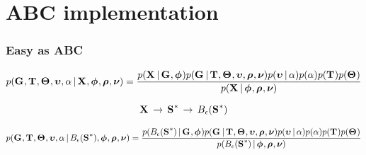 \section{ABC implementation}

\begin{frame}
    \frametitle{Easy as ABC}
    \begin{displaybox}
        \footnotesize
        \[
            p(\geneTreeVector, \divTimeMapVector, \demographicParamVector, 
            \locusMutationRateScalarVector, \locusRateHetShapeParameter \given
            \alignmentVector, \hkyModelVector, \ploidyScalarVector,
            \mutationRateScalarConstantVector) =
            \frac{p(\alignmentVector \given \geneTreeVector, \hkyModelVector)
                p(\geneTreeVector \given \divTimeMapVector, \demographicParamVector,
                \locusMutationRateScalarVector, \ploidyScalarVector,
                \mutationRateScalarConstantVector)
                p(\locusMutationRateScalarVector \given \locusRateHetShapeParameter)
                p(\locusRateHetShapeParameter)
                p(\divTimeMapVector)
                p(\demographicParamVector)}{
                p(\alignmentVector \given \hkyModelVector, \ploidyScalarVector,
                \mutationRateScalarConstantVector)}
        \]\vspace{0mm}
    \end{displaybox}

    \[ \alignmentVector \, \to \, \ssVectorObs \, \to \, \ssSpace\]

    \begin{displaybox}
        \tiny
        \[
            p(\geneTreeVector, \divTimeMapVector, \demographicParamVector, 
            \locusMutationRateScalarVector, \locusRateHetShapeParameter \given
            \ssSpace, \hkyModelVector, \ploidyScalarVector,
            \mutationRateScalarConstantVector) =
            \frac{p(\ssSpace \given \geneTreeVector, \hkyModelVector)
                p(\geneTreeVector \given \divTimeMapVector, \demographicParamVector,
                \locusMutationRateScalarVector, \ploidyScalarVector,
                \mutationRateScalarConstantVector)
                p(\locusMutationRateScalarVector \given \locusRateHetShapeParameter)
                p(\locusRateHetShapeParameter)
                p(\divTimeMapVector)
                p(\demographicParamVector)}{
                p(\ssSpace \given \hkyModelVector, \ploidyScalarVector,
                \mutationRateScalarConstantVector)}
        \]\vspace{0mm}
    \end{displaybox}
\end{frame}

